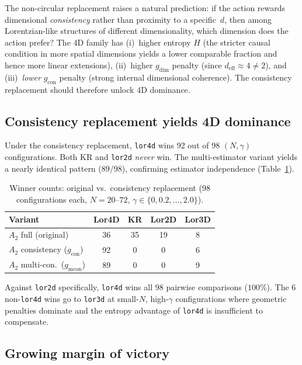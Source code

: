 \documentclass[12pt,a4paper]{article}
\begin{document}
The non-circular replacement raises a natural prediction: if the action rewards
dimensional \emph{consistency} rather than proximity to a specific~$d$, then
among Lorentzian-like structures of different dimensionality, which dimension
does the action prefer? The 4D family has (i)~higher entropy $H$ (the stricter
causal condition in more spatial dimensions yields a lower comparable fraction
and hence more linear extensions), (ii)~higher $g_{\text{dim}}$ penalty (since
$d_{\mathrm{eff}} \approx 4 \neq 2$), and (iii)~\emph{lower} $g_{\text{con}}$
penalty (strong internal dimensional coherence). The consistency replacement
should therefore unlock 4D dominance.

\subsection{Consistency replacement yields 4D dominance}
\label{sec:4d_dominance}

Under the consistency replacement, \texttt{lor4d} wins 92 out of 98
$(N, \gamma)$ configurations. Both KR and \texttt{lor2d} \emph{never} win. The
multi-estimator variant yields a nearly identical pattern ($89/98$), confirming
estimator independence (Table~\ref{tab:replacement}).

\begin{table}[h]
\centering
\caption{Winner counts: original vs.\ consistency replacement (98
configurations each, $N = 20$--$72$, $\gamma \in \{0, 0.2, \ldots, 2.0\}$).}
\label{tab:replacement}
\begin{tabular}{lcccc}
\toprule
\textbf{Variant} & \textbf{Lor4D} & \textbf{KR} & \textbf{Lor2D} &
\textbf{Lor3D} \\
\midrule
$A_2$ full (original) & 36 & 35 & 19 & 8 \\
$A_2$ consistency ($g_{\text{con}}$) & 92 & 0 & 0 & 6 \\
$A_2$ multi-con.\ ($g_{\text{mcon}}$) & 89 & 0 & 0 & 9 \\
\bottomrule
\end{tabular}
\end{table}

Against \texttt{lor2d} specifically, \texttt{lor4d} wins all 98 pairwise
comparisons ($100\%$). The 6 non-\texttt{lor4d} wins go to \texttt{lor3d} at
small-$N$, high-$\gamma$ configurations where geometric penalties dominate and
the entropy advantage of \texttt{lor4d} is insufficient to compensate.

\subsection{Growing margin of victory}
\label{sec:margin}
\end{document}
